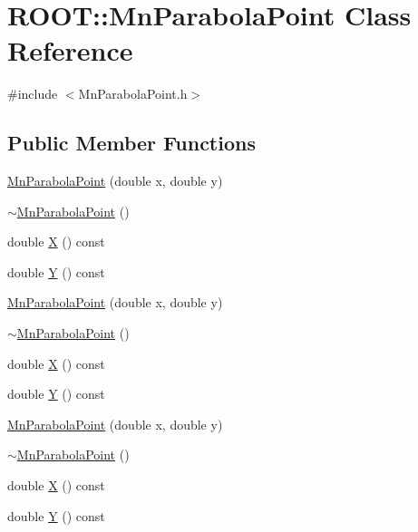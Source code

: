 \hypertarget{classROOT_1_1Minuit2_1_1MnParabolaPoint}{}\section{R\+O\+OT\+:\+:Mn\+Parabola\+Point Class Reference}
\label{classROOT_1_1Minuit2_1_1MnParabolaPoint}


{\ttfamily \#include $<$Mn\+Parabola\+Point.\+h$>$}

\subsection*{Public Member Functions}
\begin{DoxyCompactItemize}
\item 
\mbox{\hyperlink{classROOT_1_1Minuit2_1_1MnParabolaPoint_a6ce250c4449c7ca37c2772462a88190b}{Mn\+Parabola\+Point}} (double x, double y)
\item 
\mbox{\hyperlink{classROOT_1_1Minuit2_1_1MnParabolaPoint_ac2acc4c4843b4678005cb2d4610f7555}{$\sim$\+Mn\+Parabola\+Point}} ()
\item 
double \mbox{\hyperlink{classROOT_1_1Minuit2_1_1MnParabolaPoint_afdb080f9186b5fa6966a42394f2a0678}{X}} () const
\item 
double \mbox{\hyperlink{classROOT_1_1Minuit2_1_1MnParabolaPoint_abc0c0fa35bdee10c52229aadef4e20be}{Y}} () const
\item 
\mbox{\hyperlink{classROOT_1_1Minuit2_1_1MnParabolaPoint_a6ce250c4449c7ca37c2772462a88190b}{Mn\+Parabola\+Point}} (double x, double y)
\item 
\mbox{\hyperlink{classROOT_1_1Minuit2_1_1MnParabolaPoint_ac2acc4c4843b4678005cb2d4610f7555}{$\sim$\+Mn\+Parabola\+Point}} ()
\item 
double \mbox{\hyperlink{classROOT_1_1Minuit2_1_1MnParabolaPoint_afdb080f9186b5fa6966a42394f2a0678}{X}} () const
\item 
double \mbox{\hyperlink{classROOT_1_1Minuit2_1_1MnParabolaPoint_abc0c0fa35bdee10c52229aadef4e20be}{Y}} () const
\item 
\mbox{\hyperlink{classROOT_1_1Minuit2_1_1MnParabolaPoint_a6ce250c4449c7ca37c2772462a88190b}{Mn\+Parabola\+Point}} (double x, double y)
\item 
\mbox{\hyperlink{classROOT_1_1Minuit2_1_1MnParabolaPoint_ac2acc4c4843b4678005cb2d4610f7555}{$\sim$\+Mn\+Parabola\+Point}} ()
\item 
double \mbox{\hyperlink{classROOT_1_1Minuit2_1_1MnParabolaPoint_afdb080f9186b5fa6966a42394f2a0678}{X}} () const
\item 
double \mbox{\hyperlink{classROOT_1_1Minuit2_1_1MnParabolaPoint_abc0c0fa35bdee10c52229aadef4e20be}{Y}} () const
\end{DoxyCompactItemize}


